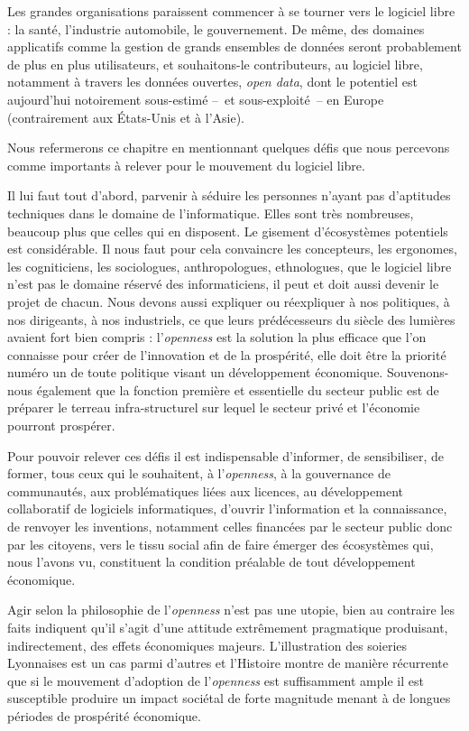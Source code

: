\documentclass{FramateX}
\begin{document}
\begin{refsection}
Les grandes organisations paraissent commencer à se tourner vers le
logiciel libre : la santé, l'industrie automobile, le gouvernement. De
même, des domaines applicatifs comme la gestion de grands ensembles de
données seront probablement de plus en plus utilisateurs, et
souhaitons-le contributeurs, au logiciel libre, notamment à travers les
données ouvertes, \textit{open data}, dont le potentiel est
aujourd'hui notoirement sous-estimé --~et sous-exploité~-- en Europe (contrairement aux \'Etats-Unis et à l'Asie).

Nous refermerons ce chapitre en mentionnant quelques défis que nous
percevons comme importants à relever pour le mouvement du logiciel
libre.

Il lui faut tout d'abord, parvenir à séduire les personnes n'ayant pas
d'aptitudes techniques dans le domaine de
l'informatique. Elles sont très nombreuses, beaucoup
plus que celles qui en disposent. Le gisement d'écosystèmes potentiels
est considérable. Il nous faut pour cela convaincre les concepteurs,
les ergonomes, les cogniticiens, les sociologues, anthropologues,
ethnologues, que le logiciel libre n'est pas le domaine réservé des
informaticiens, il peut et doit aussi devenir le projet de chacun. Nous
devons aussi expliquer ou réexpliquer à nos politiques, à nos
dirigeants, à nos industriels, ce que leurs prédécesseurs du siècle des
lumières avaient fort bien compris : l'\textit{openness} est la
solution la plus efficace que l'on connaisse pour créer de l'innovation
et de la prospérité, elle doit être la priorité numéro un de toute
politique visant un développement économique. Souvenons-nous également
que la fonction première et essentielle du secteur public est de
préparer le terreau infra-structurel sur lequel le secteur privé et
l'économie pourront prospérer.

Pour pouvoir relever ces défis il est indispensable
d'informer, de sensibiliser, de former, tous ceux qui
le souhaitent, à l'\textit{openness}, à la gouvernance
de communautés, aux problématiques liées aux licences, au développement
collaboratif de logiciels informatiques, d'ouvrir
l'information et la connaissance, de renvoyer les
inventions, notamment celles financées par le secteur public donc par
les citoyens, vers le tissu social afin de faire émerger des
écosystèmes qui, nous l'avons vu, constituent la
condition préalable de tout développement économique.

Agir selon la philosophie de l'\textit{openness}
n'est pas une utopie, bien au contraire les faits
indiquent qu'il s'agit
d'une attitude extrêmement pragmatique produisant,
indirectement, des effets économiques majeurs.
L'illustration des soieries Lyonnaises est un cas
parmi d'autres et l'Histoire montre
de manière récurrente que si le mouvement d'adoption
de l'\textit{openness} est suffisamment ample il est
susceptible produire un impact sociétal de forte magnitude menant à de
longues périodes de prospérité économique.


\end{refsection}
\end{document}
